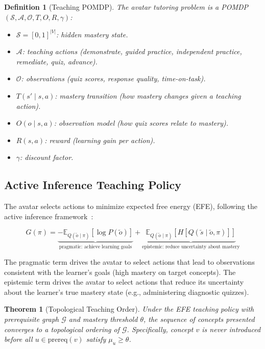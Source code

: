 \documentclass[11pt,letterpaper]{article}
\newtheorem{theorem}{Theorem}[section]
\newtheorem{definition}{Definition}[section]
\newcommand{\E}{\mathbb{E}}
\begin{document}
\begin{definition}[Teaching POMDP]
The avatar tutoring problem is a POMDP $(\mathcal{S}, \mathcal{A}, \mathcal{O}, T, O, R, \gamma)$:
\begin{itemize}
    \item $\mathcal{S} = [0,1]^{|V|}$: hidden mastery state.
    \item $\mathcal{A}$: teaching actions (demonstrate, guided practice, independent practice, remediate, quiz, advance).
    \item $\mathcal{O}$: observations (quiz scores, response quality, time-on-task).
    \item $T(s' \mid s, a)$: mastery transition (how mastery changes given a teaching action).
    \item $O(o \mid s, a)$: observation model (how quiz scores relate to mastery).
    \item $R(s, a)$: reward (learning gain per action).
    \item $\gamma$: discount factor.
\end{itemize}
\end{definition}

\subsection{Active Inference Teaching Policy}

The avatar selects actions to minimize expected free energy (EFE), following the active inference framework~\cite{friston2017active}:

\begin{equation}
G(\pi) = \underbrace{-\E_{Q(\tilde{o} \mid \pi)}[\log P(\tilde{o})]}_{\text{pragmatic: achieve learning goals}} + \underbrace{\E_{Q(\tilde{o} \mid \pi)}[H[Q(\tilde{s} \mid \tilde{o}, \pi)]]}_{\text{epistemic: reduce uncertainty about mastery}}
\label{eq:efe_teach}
\end{equation}

The pragmatic term drives the avatar to select actions that lead to observations consistent with the learner's goals (high mastery on target concepts). The epistemic term drives the avatar to select actions that reduce its uncertainty about the learner's true mastery state (e.g., administering diagnostic quizzes).

\begin{theorem}[Topological Teaching Order]
\label{thm:topological}
Under the EFE teaching policy with prerequisite graph $\mathcal{G}$ and mastery threshold $\theta$, the sequence of concepts presented converges to a topological ordering of $\mathcal{G}$. Specifically, concept $v$ is never introduced before all $u \in \text{prereq}(v)$ satisfy $\mu_u \geq \theta$.
\end{theorem}
\end{document}
